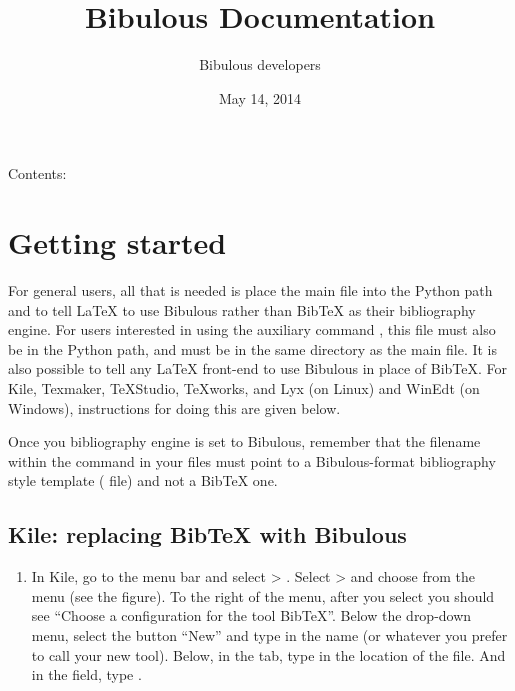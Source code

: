 \documentclass[letterpaper,10pt,english]{sphinxmanual}
\title{Bibulous Documentation}
\date{May 14, 2014}
\author{Bibulous developers}
\begin{document}
\maketitle
\tableofcontents
{}\label{index::doc}


Contents:


\chapter{Getting started}
\label{getting_started:bibulous-documentation}\label{getting_started:getting-started}\label{getting_started::doc}
For general users, all that is needed is place the main  file into the Python path and to tell LaTeX to use Bibulous rather than BibTeX as their bibliography engine. For users interested in using the auxiliary command , this file must also be in the Python path, and must be in the same directory as the main file. It is also possible to tell any LaTeX front-end to use Bibulous in place of BibTeX. For Kile, Texmaker, TeXStudio, TeXworks, and Lyx (on Linux) and WinEdt (on Windows), instructions for doing this are given below.

Once you bibliography engine is set to Bibulous, remember that the filename within the  command in your  files must point to a Bibulous-format bibliography style template ( file) and not a BibTeX one.


\section{Kile: replacing BibTeX with Bibulous}
\label{getting_started:kile-replacing-bibtex-with-bibulous}\begin{enumerate}
\item {} 
In Kile, go to the menu bar and select  \textgreater{} . Select  \textgreater{}  and choose  from the  menu (see the figure). To the right of the menu, after you select  you should see ``Choose a configuration for the tool BibTeX''. Below the drop-down menu, select the button ``New'' and type in the name  (or whatever you prefer to call your new tool). Below, in the  tab, type in the location of the  file. And in the  field, type .

\end{enumerate}
\end{document}
